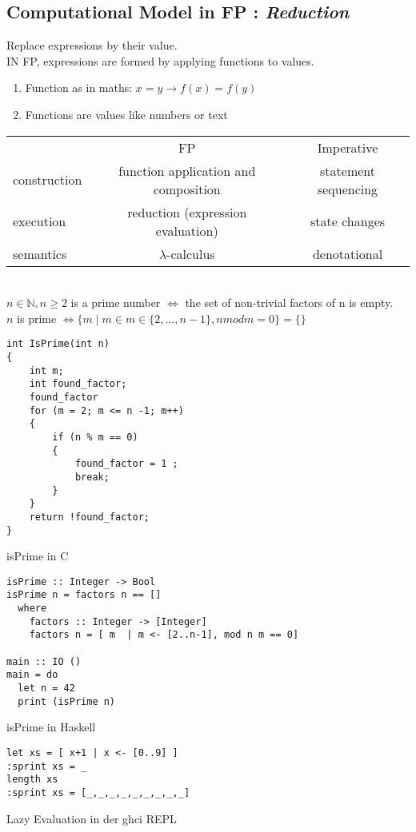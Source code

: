 \documentclass{article}
\begin{document}
\subsection{Computational Model in FP : \emph{Reduction}}
Replace expressions by their value.\\
IN FP, expressions are formed by applying functions to values.
\begin{enumerate}
\item Function as in maths: $x = y \rightarrow f(x) = f(y)$
\item Functions are values like numbers or text
\end{enumerate}
\begin{tabular}{l|c|c}
&FP&Imperative\\
construction & function application and composition & statement sequencing\\
execution & reduction (expression evaluation) & state changes\\
semantics & $\lambda$-calculus&denotational
\end{tabular}\bigskip\\
$ n \in \mathbb{N}, n \geq 2$ is a prime number $\Leftrightarrow$ the set of non-trivial factors of n is empty.\\
$n$ is prime $\Leftrightarrow \{ m \mid m \in m \in \{2,\ldots,n-1\}, n mod m = 0 \} = \{\}$\\
\begin{listing}[h!]
\begin{verbatim}
int IsPrime(int n)
{
    int m;
    int found_factor;
    found_factor
    for (m = 2; m <= n -1; m++)
    {
        if (n % m == 0)
        {
            found_factor = 1 ;
            break;
        }
    }
    return !found_factor;
}
\end{verbatim}
\caption{isPrime in C}
\end{listing}
\begin{listing}[h!]
\begin{verbatim}
isPrime :: Integer -> Bool
isPrime n = factors n == []
  where 
    factors :: Integer -> [Integer]
    factors n = [ m  | m <- [2..n-1], mod n m == 0]

main :: IO ()
main = do
  let n = 42
  print (isPrime n)
\end{verbatim}
\caption{isPrime in Haskell}
\end{listing}
\newpage
{}
\begin{listing}[h!]
\begin{verbatim}
let xs = [ x+1 | x <- [0..9] ]
:sprint xs = _
length xs
:sprint xs = [_,_,_,_,_,_,_,_,_]
\end{verbatim}
\caption{Lazy Evaluation in der ghci REPL}
\end{listing}
\end{document}
